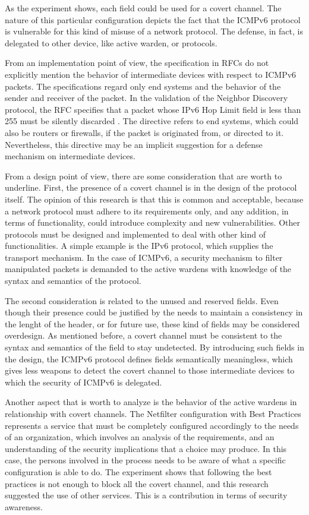 \documentclass[12pt]{article}
\begin{document}
As the experiment shows, each field could be used for a covert channel. The nature of this particular configuration depicts the fact that the ICMPv6 protocol is vulnerable for this kind of misuse of a network protocol. The defense, in fact, is delegated to other device, like active warden, or protocols.

From an implementation point of view, the specification in RFCs do not explicitly mention the behavior of intermediate devices with respect to ICMPv6 packets. The specifications regard only end systems and the behavior of the sender and receiver of the packet. In the validation of the Neighbor Discovery protocol, the RFC specifies that a packet whose IPv6 Hop Limit field is less than 255 must be silently discarded \cite{rfc4861}. The directive refers to end systems, which could also be routers or firewalls, if the packet is originated from, or directed to it. Nevertheless, this directive may be an implicit suggestion for a defense mechanism on intermediate devices. 

From a design point of view, there are some consideration that are worth to underline. First, the presence of a covert channel is in the design of the protocol itself. The opinion of this research is that this is common and acceptable, because a network protocol must adhere to its requirements only, and any addition, in terms of functionality, could introduce complexity and new vulnerabilities. Other protocols must be designed and implemented to deal with other kind of functionalities. A simple example is the IPv6 protocol, which supplies the transport mechanism. In the case of ICMPv6, a security mechanism to filter manipulated packets is demanded to the active wardens with knowledge of the syntax and semantics of the protocol.

The second consideration is related to the unused and reserved fields. Even though their presence could be justified by the needs to maintain a consistency in the lenght of the header, or for future use, these kind of fields may be considered overdesign. As mentioned before, a covert channel must be consistent to the syntax and semantics of the field to stay undetected. By introducing such fields in the design, the ICMPv6 protocol defines fields semantically meaningless, which gives less weapons to detect the covert channel to those intermediate devices to which the security of ICMPv6 is delegated.

Another aspect that is worth to analyze is the behavior of the active wardens in relationship with covert channels. The Netfilter configuration with Best Practices represents a service that must be completely configured accordingly to the needs of an organization, which involves an analysis of the requirements, and an understanding of the security implications that a choice may produce. In this case, the persons involved in the process needs to be aware of what a specific configuration is able to do. The experiment shows that following the best practices is not enough to block all the covert channel, and this research suggested the use of other services. This is a contribution in terms of security awareness.
\end{document}
